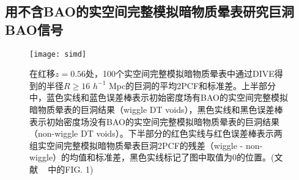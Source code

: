 {%

\subsection{用不含BAO的实空间完整模拟暗物质晕表研究巨洞BAO信号}
\label{sec:wigglenonwiggle}
\begin{figure}
\centering
\texttt{[image: simd]}
\caption{ 在红移$z = 0.56$处，100个实空间完整模拟暗物质晕表中通过DIVE得到的半径$R \geq 16$ $h^{-1}$ Mpc的巨洞的平均2PCF和标准差。上半部分中，蓝色实线和蓝色误差棒表示初始密度场有BAO的实空间完整模拟暗物质晕表的巨洞结果（wiggle DT voids），黑色实线和黑色误差棒表示初始密度场没有BAO的实空间完整模拟暗物质晕表的巨洞结果（non-wiggle DT voids）。下半部分的红色实线与红色误差棒表示两组实空间完整模拟暗物质晕表巨洞2PCF的残差（wiggle - non-wiggle）的均值和标准差，黑色实线标记了图中取值为0的位置。(文献 ~ 中的FIG. 1)}
\label{fig:wigglenonwiggle}
\end{figure}

}

